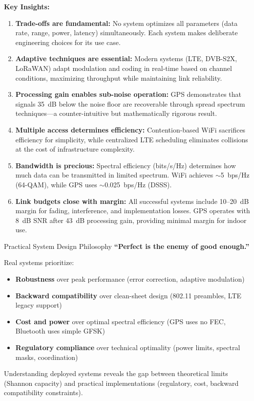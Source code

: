 \textbf{Key Insights:}

\begin{enumerate}
\item \textbf{Trade-offs are fundamental:} No system optimizes all parameters (data rate, range, power, latency) simultaneously. Each system makes deliberate engineering choices for its use case.

\item \textbf{Adaptive techniques are essential:} Modern systems (LTE, DVB-S2X, LoRaWAN) adapt modulation and coding in real-time based on channel conditions, maximizing throughput while maintaining link reliability.

\item \textbf{Processing gain enables sub-noise operation:} GPS demonstrates that signals 35~dB below the noise floor are recoverable through spread spectrum techniques---a counter-intuitive but mathematically rigorous result.

\item \textbf{Multiple access determines efficiency:} Contention-based WiFi sacrifices efficiency for simplicity, while centralized LTE scheduling eliminates collisions at the cost of infrastructure complexity.

\item \textbf{Bandwidth is precious:} Spectral efficiency (bits/s/Hz) determines how much data can be transmitted in limited spectrum. WiFi achieves $\sim$5~bps/Hz (64-QAM), while GPS uses $\sim$0.025~bps/Hz (DSSS).

\item \textbf{Link budgets close with margin:} All successful systems include 10--20~dB margin for fading, interference, and implementation losses. GPS operates with 8~dB SNR after 43~dB processing gain, providing minimal margin for indoor use.
\end{enumerate}

\begin{calloutbox}[colback=black!8!white,colframe=black]{Practical System Design Philosophy}
\textbf{``Perfect is the enemy of good enough.''}

Real systems prioritize:
\begin{itemize}
\item \textbf{Robustness} over peak performance (error correction, adaptive modulation)
\item \textbf{Backward compatibility} over clean-sheet design (802.11 preambles, LTE legacy support)
\item \textbf{Cost and power} over optimal spectral efficiency (GPS uses no FEC, Bluetooth uses simple GFSK)
\item \textbf{Regulatory compliance} over technical optimality (power limits, spectral masks, coordination)
\end{itemize}

Understanding deployed systems reveals the gap between theoretical limits (Shannon capacity) and practical implementations (regulatory, cost, backward compatibility constraints).
\end{calloutbox}

